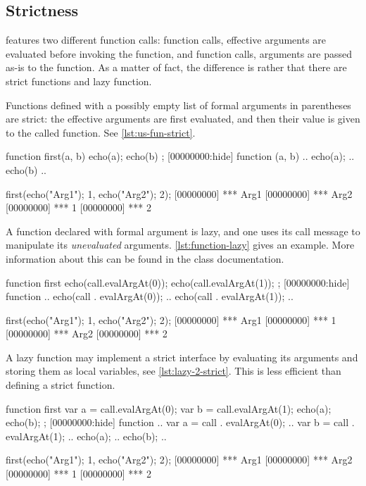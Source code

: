 \subsection{Strictness}

\us features two different function calls:  function
calls, effective arguments are evaluated before invoking the function,
and  function calls, arguments are passed as-is to the
function.  As a matter of fact, the difference is rather that there
are strict functions and lazy function.

Functions defined with a possibly empty list of formal arguments in
parentheses are strict: the effective arguments are first evaluated,
and then their value is given to the called function.  See
\autoref{lst:us-fun-strict}.

\begin{urbiscript}[caption=Strict Functions,
  label=lst:us-fun-strict,float=\floatpos]
function first(a, b) {
  echo(a); echo(b)
};
[00000000:hide] function (a, b) {
..  echo(a);
..  echo(b)
..}

first({echo("Arg1"); 1},
      {echo("Arg2"); 2});
[00000000] *** Arg1
[00000000] *** Arg2
[00000000] *** 1
[00000000] *** 2
\end{urbiscript}

A function declared with formal argument is lazy, and one uses its
call message to manipulate its \emph{unevaluated} arguments.
\autoref{lst:function-lazy} gives an example.  More information about
this can be found in the  class documentation.

\begin{urbiscript}[caption=Lazy
  function,label=lst:function-lazy]
function first
{
  echo(call.evalArgAt(0));
  echo(call.evalArgAt(1));
};
[00000000:hide] function {
..  echo(call . evalArgAt(0));
..  echo(call . evalArgAt(1));
..}

first({echo("Arg1"); 1},
      {echo("Arg2"); 2});
[00000000] *** Arg1
[00000000] *** 1
[00000000] *** Arg2
[00000000] *** 2
\end{urbiscript}

A lazy function may implement a strict interface by evaluating its
arguments and storing them as local variables, see
\autoref{lst:lazy-2-strict}.  This is less efficient than defining a
strict function.

\begin{urbiscript}[caption=Lazy functions with strict semantics,
  label=lst:lazy-2-strict]
function first
{
  var a = call.evalArgAt(0);
  var b = call.evalArgAt(1);
  echo(a); echo(b);
};
[00000000:hide] function {
..  var a = call . evalArgAt(0);
..  var b = call . evalArgAt(1);
..  echo(a);
..  echo(b);
..}

first({echo("Arg1"); 1},
      {echo("Arg2"); 2});
[00000000] *** Arg1
[00000000] *** Arg2
[00000000] *** 1
[00000000] *** 2
\end{urbiscript}

